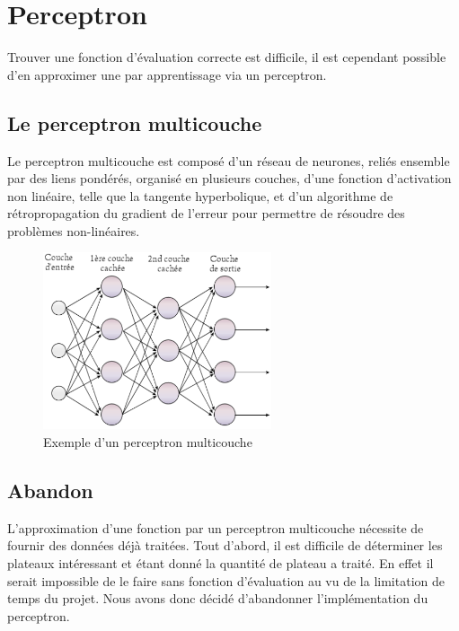 \section{Perceptron}

		Trouver une fonction d'évaluation correcte est difficile, il est cependant possible
		d'en approximer une par apprentissage via un perceptron.

	\subsection{Le perceptron multicouche}
		Le perceptron multicouche est composé d'un réseau de neurones, reliés ensemble par des liens pondérés,
		organisé en plusieurs couches, d'une fonction d'activation non linéaire, telle que la tangente hyperbolique, et d'un
		algorithme de rétropropagation du gradient de l'erreur pour permettre de résoudre des problèmes non-linéaires.

		\begin{figure}[h]
			\centering
			\includegraphics[width=0.6\textwidth]{images/Perceptron_4layers.png}
			\caption{Exemple d'un perceptron multicouche}
			\label{fig:perceptron_multi}
		\end{figure}


	\subsection{Abandon}
		L'approximation d'une fonction par un perceptron multicouche nécessite de fournir des données
		déjà traitées. Tout d'abord, il est difficile de déterminer les plateaux intéressant et étant
		donné la quantité de plateau a traité. En effet il serait impossible de le faire sans fonction
		d'évaluation au vu de la limitation de temps du projet. Nous avons donc décidé d'abandonner
		l'implémentation du perceptron.
